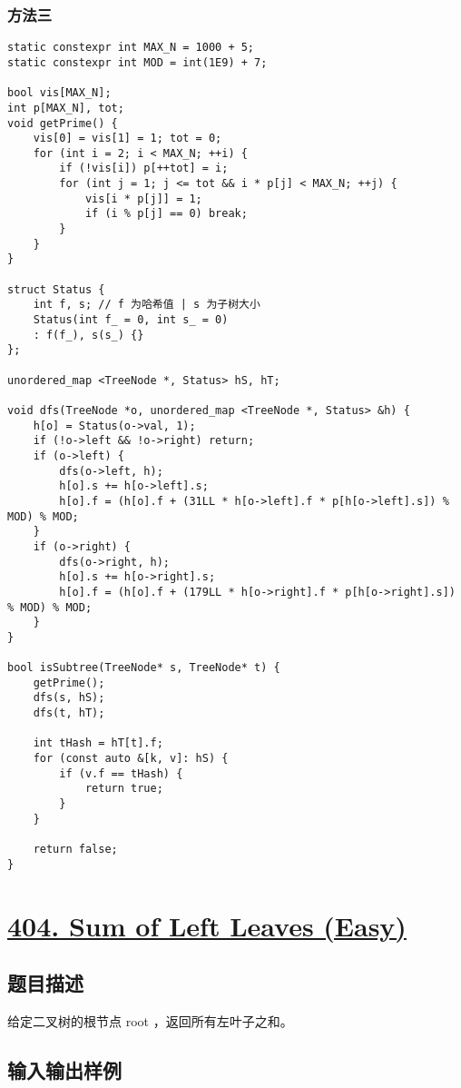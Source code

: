 \documentclass[lang=cn,10pt]{elegantbook}
\begin{document}
\subsubsection*{方法三}

\begin{lstlisting}
static constexpr int MAX_N = 1000 + 5;
static constexpr int MOD = int(1E9) + 7;

bool vis[MAX_N];
int p[MAX_N], tot;
void getPrime() {
	vis[0] = vis[1] = 1; tot = 0;
	for (int i = 2; i < MAX_N; ++i) {
		if (!vis[i]) p[++tot] = i;
		for (int j = 1; j <= tot && i * p[j] < MAX_N; ++j) {
			vis[i * p[j]] = 1;
			if (i % p[j] == 0) break;
		}
	}
}

struct Status {
	int f, s; // f 为哈希值 | s 为子树大小
	Status(int f_ = 0, int s_ = 0) 
	: f(f_), s(s_) {}
};

unordered_map <TreeNode *, Status> hS, hT;

void dfs(TreeNode *o, unordered_map <TreeNode *, Status> &h) {
	h[o] = Status(o->val, 1);
	if (!o->left && !o->right) return;
	if (o->left) {
		dfs(o->left, h);
		h[o].s += h[o->left].s;
		h[o].f = (h[o].f + (31LL * h[o->left].f * p[h[o->left].s]) % MOD) % MOD;
	}
	if (o->right) {
		dfs(o->right, h);
		h[o].s += h[o->right].s;
		h[o].f = (h[o].f + (179LL * h[o->right].f * p[h[o->right].s]) % MOD) % MOD;
	}
}

bool isSubtree(TreeNode* s, TreeNode* t) {
	getPrime();
	dfs(s, hS);
	dfs(t, hT);
	
	int tHash = hT[t].f;
	for (const auto &[k, v]: hS) {
		if (v.f == tHash) {
			return true;
		}
	} 
	
	return false;
}
\end{lstlisting}

{\color{red}\section{\href{https://leetcode.cn/problems/sum-of-left-leaves/}{404. Sum of Left Leaves (Easy)}}} \label{ch14.404}

\subsection*{题目描述}

给定二叉树的根节点 root ，返回所有左叶子之和。

\subsection*{输入输出样例}
\end{document}
